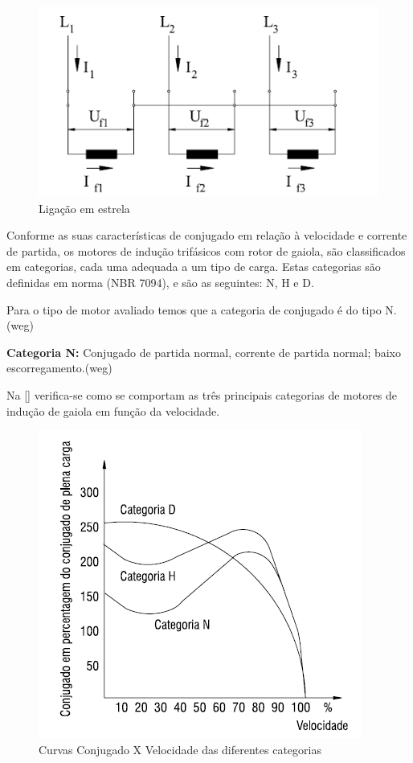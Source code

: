 \begin{figure}[!ht]
\centering
\includegraphics[scale=0.8]{figuras/ESTRELA.png}
\caption{Ligação em estrela}
\label{fig:ESTRELA}
\end{figure}

Conforme as suas características de conjugado em relação à velocidade e corrente de partida, os motores de indução trifásicos com rotor de gaiola, são classificados em categorias, cada uma adequada a um tipo de carga. Estas categorias são definidas em norma (NBR 7094), e são as seguintes: N, H e D. 

Para o tipo de motor avaliado temos que a categoria de conjugado é do tipo N. (weg)

\textbf{Categoria N:} Conjugado de partida normal, corrente de partida normal; baixo escorregamento.(weg)

Na \ref{} verifica-se como se comportam as três principais categorias de motores de indução de gaiola em função da velocidade.

\begin{figure}[!ht]
\centering
\includegraphics[scale=0.8]{figuras/conjugado_N.png}
\caption{Curvas Conjugado X Velocidade das diferentes categorias}
\label{fig:conjugado_N}
\end{figure}

